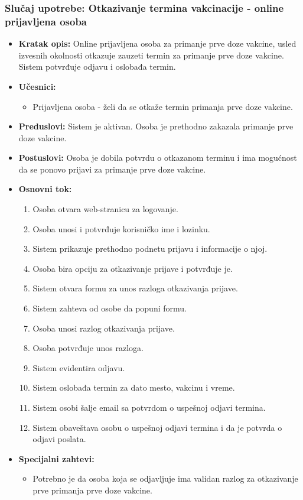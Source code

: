 \documentclass[titlepage]{article}
\begin{document}
\subsubsection{Slučaj upotrebe: Otkazivanje termina vakcinacije - online prijavljena osoba}
\begin{itemize}
    \item \textbf{Kratak opis:} Online prijavljena osoba za primanje prve doze vakcine, usled izvesnih okolnosti otkazuje zauzeti termin za primanje prve doze vakcine. Sistem potvrđuje odjavu i oslobađa termin.
    \item \textbf{Učesnici:}
        \begin{itemize}
            \item Prijavljena osoba - želi da se otkaže termin primanja prve doze vakcine.
        \end{itemize}
    \item \textbf{Preduslovi:} Sistem je aktivan. Osoba je prethodno zakazala primanje prve doze vakcine.
    \item \textbf{Postuslovi:} Osoba je dobila potvrdu o otkazanom terminu i ima mogućnost da se ponovo prijavi za primanje prve doze vakcine.
    \item \textbf{Osnovni tok:}
        \begin{enumerate}
            \item Osoba otvara web-stranicu za logovanje.
	    \item Osoba unosi i potvrđuje korisničko ime i lozinku.
	    \item Sistem prikazuje prethodno podnetu prijavu i informacije o njoj.
	    \item Osoba bira opciju za otkazivanje prijave i potvrđuje je.
	    \item Sistem otvara formu za unos razloga otkazivanja prijave.
	    \item Sistem zahteva od osobe da popuni formu.
	    \item Osoba unosi razlog otkazivanja prijave.
            \item Osoba potvrđuje unos razloga.
	    \item Sistem evidentira odjavu.
	    \item Sistem oslobađa termin za dato mesto, vakcinu i vreme.
	    \item Sistem osobi šalje email sa potvrdom o uspešnoj odjavi termina.
	    \item Sistem obaveštava osobu o uspešnoj odjavi termina i da je potvrda o odjavi poslata.
	\end{enumerate}
     
    
    \item \textbf{Specijalni zahtevi:}
		\begin{itemize}
			\item Potrebno je da osoba koja se odjavljuje ima validan razlog za otkazivanje prve primanja prve doze vakcine.
		\end{itemize}
\end{itemize}
\end{document}
